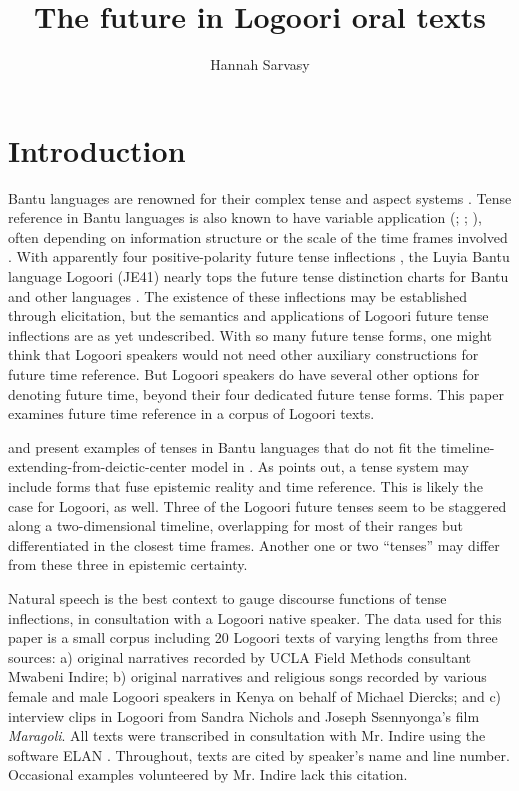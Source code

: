 \documentclass[output=paper]{langsci/langscibook}
\title{The future in Logoori oral texts}
\author{%
Hannah Sarvasy \affiliation{Australian National University} 
}
\begin{document}
\section{Introduction} \label{sec:sarvasy:1}

Bantu languages are renowned for their complex tense and aspect systems \citep{Nurse2003aspect,Nurse2008}. Tense reference in Bantu languages is also known to have variable application (\citealt{Besha1989}; \citealt[101]{Nurse2003aspect}; \citealt{Crane2011}), often depending on information structure or the scale of the time frames involved \citep{BotneKershner2008,Botne2013}. With apparently four positive-polarity future tense inflections \citep{Mould1981,Leung1991,Nurse2003aspect}, the Luyia Bantu language Logoori (JE41) nearly tops the future tense distinction charts for Bantu and other languages \citep[89]{Nurse2008}. The existence of these inflections may be established through elicitation, but the semantics and applications of Logoori future tense inflections are as yet undescribed. With so many future tense forms, one might think that Logoori speakers would not need other auxiliary constructions for future time reference. But Logoori speakers do have several other options for denoting future time, beyond their four dedicated future tense forms. This paper examines future time reference in a corpus of Logoori texts.

\citet{BotneKershner2008} and \citet{Botne2013} present examples of tenses in Bantu languages that do not fit the timeline-extending-from-deictic-center model in \citet{Comrie1985}. As \citet{Botne2013} points out, a tense system may include forms that fuse epistemic reality and time reference. This is likely the case for Logoori, as well. Three of the Logoori future tenses seem to be staggered along a two-dimensional timeline, overlapping for most of their ranges but differentiated in the closest time frames. Another one or two “tenses” may differ from these three in epistemic certainty. 

Natural speech is the best context to gauge discourse functions of tense inflections, in consultation with a Logoori native speaker. The data used for this paper is a small corpus including 20 Logoori texts of varying lengths from three sources: a) original narratives recorded by UCLA Field Methods consultant Mwabeni Indire; b) original narratives and religious songs recorded by various female and male Logoori speakers in Kenya on behalf of Michael Diercks; and c) interview clips in Logoori from Sandra Nichols and Joseph Ssennyonga’s \citeyear{NicholsSsennyonga1976} film \textit{Maragoli}. All texts were transcribed in consultation with Mr. Indire using the software ELAN \citep{SloetjesWittenberg2008}. Throughout, texts are cited by speaker’s name and line number. Occasional examples volunteered by Mr. Indire lack this citation.
\end{document}
